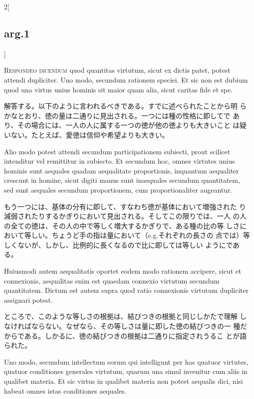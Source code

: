\documentclass[paper=a4paper,fontsize=10pt,jafontsize=9pt,titlepage]{jlreq}
\begin{document}
\begin{paracol}{2}[\subsection{arg.1}]

{\scshape Respondeo dicendum} quod quantitas virtutum, sicut ex
 dictis patet, potest attendi dupliciter. Uno modo, secundum rationem
 speciei. Et sic non est dubium quod una virtus unius hominis sit
 maior quam alia, sicut caritas fide et spe.

\switchcolumn

解答する。以下のように言われるべきである。すでに述べられたことから明
 らかなとおり、徳の量は二通りに見出される。一つには種の性格に即してで
 あり、その場合には、一人の人に属する一つの徳が他の徳よりも大きいこと
 は疑いない。たとえば、愛徳は信仰や希望よりも大きい。

\switchcolumn*

Alio modo potest attendi secundum participationem subiecti, prout
 scilicet intenditur vel remittitur in subiecto. Et secundum hoc,
 omnes virtutes unius hominis sunt aequales quadam aequalitate
 proportionis, inquantum aequaliter crescunt in homine, sicut digiti
 manus sunt inaequales secundum quantitatem, sed sunt aequales
 secundum proportionem, cum proportionaliter augeantur.

\switchcolumn

もう一つには、基体の分有に即して、すなわち徳が基体において増強された
 り減弱されたりするかぎりにおいて見出される。そしてこの限りでは、一人
 の人の全ての徳は、その人の中で等しく増大するかぎりで、ある種の比の等
 しさにおいて等しい。ちょうど手の指は量において（e.g.それぞれの長さの
 点では）等しくないが、しかし、比例的に長くなるので比に即しては等しい
 ようにである。

\switchcolumn*

Huiusmodi autem aequalitatis oportet eodem modo rationem accipere,
 sicut et connexionis, aequalitas enim est quaedam connexio virtutum
 secundum quantitatem. Dictum est autem supra quod ratio connexionis
 virtutum dupliciter assignari potest.

\switchcolumn

ところで、このような等しさの根拠は、結びつきの根拠と同じしかたで理解
 しなければならない。なぜなら、その等しさは量に即した徳の結びつきの一
 種だからである。しかるに、徳の結びつきの根拠は二通りに指定されうるこ
 とが語られた。

\switchcolumn*

Uno modo, secundum intellectum eorum qui intelligunt per has quatuor
 virtutes, quatuor conditiones generales virtutum, quarum una simul
 invenitur cum aliis in qualibet materia. Et sic virtus in qualibet
 materia non potest aequalis dici, nisi habeat omnes istas conditiones
 aequales.


\end{paracol}
\end{document}

